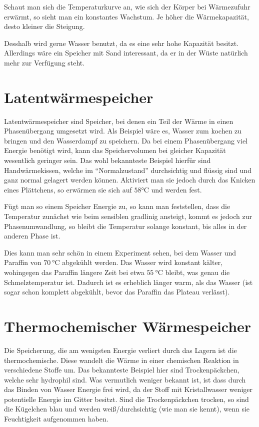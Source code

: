 \documentclass[12pt,a4paper,titlepage,headinclude,bibtotoc]{scrartcl}
\begin{document}
Schaut man sich die Temperaturkurve an, wie sich der Körper bei Wärmezufuhr erwärmt, so sieht man ein konstantes Wachstum.
Je höher die Wärmekapazität, desto kleiner die Steigung.

Desshalb wird gerne Wasser benutzt, da es eine sehr hohe Kapazität besitzt.
Allerdings wäre ein Speicher mit Sand interessant, da er in der Wüste natürlich mehr zur Verfügung steht.





\section{Latentwärmespeicher}
Latentwärmespeicher sind Speicher, bei denen ein Teil der Wärme in einen Phasenübergang umgesetzt wird.
Als Beispiel wäre es, Wasser zum kochen zu bringen und den Wasserdampf zu speichern.
Da bei einem Phasenübergang viel Energie benötigt wird, kann das Speichervolumen bei gleicher Kapazität wesentlich geringer sein.
Das wohl bekannteste Beispiel hierfür sind Handwärmekissen, welche im "`Normalzustand"' durchsichtig und flüssig sind und ganz normal gelagert werden können.
Aktiviert man sie jedoch durch das Knicken eines Plättchens, so erwärmen sie sich auf $58\si\celsius$ und werden fest.

Fügt man so einem Speicher Energie zu, so kann man feststellen, dass die Temperatur zunächst wie beim sensiblen gradlinig ansteigt, kommt es jedoch zur Phasenumwandlung, so bleibt die Temperatur solange konstant, bis alles in der anderen Phase ist.

Dies kann man sehr schön in einem Experiment sehen, bei dem Wasser und Paraffin von $\SI{70}\celsius$ abgekühlt werden.
Das Wasser wird konstant kälter, wohingegen das Paraffin längere Zeit bei etwa $\SI{55}\celsius$ bleibt, was genau die Schmelztemperatur ist.
Dadurch ist es erheblich länger warm, als das Wasser (ist sogar schon komplett abgekühlt, bevor das Paraffin das Plateau verlässt).




\newpage
\section{Thermochemischer Wärmespeicher}
Die Speicherung, die am wenigsten Energie verliert durch das Lagern ist die thermochemische.
Diese wandelt die Wärme in einer chemischen Reaktion in verschiedene Stoffe um.
Das bekannteste Beispiel hier sind Trockenpäckchen, welche sehr hydrophil sind.
Was vermutlich weniger bekannt ist, ist dass durch das Binden von Wasser Energie frei wird, da der Stoff mit Kristallwasser weniger potentielle Energie im Gitter besitzt.
Sind die Trockenpäckchen trocken, so sind die Kügelchen blau und werden weiß/durchsichtig (wie man sie kennt), wenn sie Feuchtigkeit aufgenommen haben.
\end{document}
